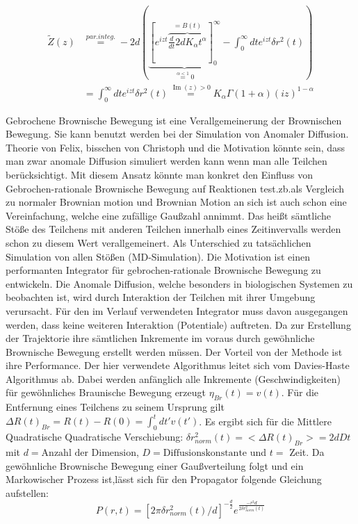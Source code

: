 \documentclass[
  a4paper,BCOR10mm,oneside,
  bibtotoc,idxtotoc,
  headsepline,footsepline,%
  fleqn,openbib
]{scrbook}
\begin{document}
\begin{align*}
 \tilde{Z}(z) & \stackrel{par. integ.}{=} - 2d \left( \underbrace{\left [ e^{izt}\overbrace{ \frac{d}{dt} 2dK_{\alpha}t^{\alpha}}^{=B(t)} \right]_{0}^{\infty}}_{\stackrel{\alpha < 1} {=} 0}-\int_{0}^{\infty} d t e^{izt} \delta r^2 (t) \right) \\
  & = \int_{0}^{\infty} d t e^{izt} \delta r^2 (t)  \stackrel{\operatorname{Im}(z)> 0} {=}  K_{\alpha} \Gamma(1+\alpha)(i z)^{1-\alpha}
\end{align*}















Gebrochene Brownische Bewegung ist eine Verallgemeinerung der Brownischen Bewegung. Sie kann benutzt werden bei der Simulation von Anomaler Diffusion.\newline \newline
Theorie von Felix, bisschen von Christoph und die Motivation könnte sein, dass man zwar anomale Diffusion simuliert werden kann wenn man alle Teilchen berücksichtigt. Mit diesem Ansatz könnte man konkret den Einfluss von Gebrochen-rationale Brownische Bewegung auf Reaktionen test.zb.als Vergleich zu normaler Brownian motion und Brownian Motion an sich ist auch schon eine Vereinfachung, welche eine zufällige Gaußzahl annimmt. Das heißt sämtliche Stöße des Teilchens mit anderen Teilchen innerhalb eines Zeitinvervalls werden schon zu diesem Wert verallgemeinert. Als Unterschied zu tatsächlichen Simulation von allen Stößen (MD-Simulation).
Die Motivation ist einen performanten Integrator für gebrochen-rationale Brownische Bewegung zu entwickeln. Die Anomale Diffusion, welche besonders in biologischen Systemen zu beobachten ist, wird durch Interaktion der Teilchen mit ihrer Umgebung verursacht. Für den im Verlauf verwendeten Integrator muss davon ausgegangen werden, dass keine weiteren Interaktion (Potentiale) auftreten. Da zur Erstellung der Trajektorie ihre sämtlichen Inkremente im voraus durch gewöhnliche Brownische Bewegung erstellt werden müssen. Der Vorteil von der Methode ist ihre Performance.  
Der hier verwendete Algorithmus leitet sich vom Davies-Haste Algorithmus \cite{Craigmile2003} ab.
Dabei werden anfänglich alle Inkremente (Geschwindigkeiten) für gewöhnliches Braunische Bewegung erzeugt $\eta_{Br}(t)= v(t)$. Für die Entfernung eines Teilchens zu seinem Ursprung gilt  $\Delta R(t)_{Br} = R(t)- R(0)= \int^t_{0}dt' v(t')$. Es ergibt sich für die Mittlere Quadratische Quadratische Verschiebung: \newline $\delta r^{2}_{norm}(t)= < \Delta R(t)_{Br}>=2dDt$ mit $d =\text{Anzahl der Dimension}$, $D = \text{Diffusionskonstante}$ und $t=$ Zeit. Da gewöhnliche Brownische Bewegung einer Gaußverteilung folgt und ein Markowischer Prozess ist,lässt sich für den Propagator  folgende Gleichung aufstellen:
\begin{equation}
 P(r,t)=[2 \pi \delta r^{2}_{norm}(t)/d]^{-\frac{d}{2}} e^{ \frac{-r^2 d}{2 \delta r^{2}_{norm}(t) }}
\end{equation}
\end{document}

